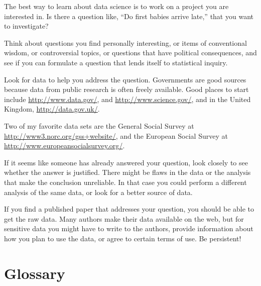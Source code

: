 \documentclass[12pt]{book}
\begin{document}
\begin{exercise}
The best way to learn about data science is to work on a project you are
interested in.  Is there a question like, ``Do first babies arrive
late,'' that you want to investigate?

Think about questions you find personally interesting, or items of
conventional wisdom, or controversial topics, or questions that have
political consequences, and see if you can formulate a question that
lends itself to statistical inquiry.

Look for data to help you address the question.  Governments are good
sources because data from public research is often freely
available.  Good places to start include \url{http://www.data.gov/},
and \url{http://www.science.gov/}, and in the United Kingdom,
\url{http://data.gov.uk/}.

Two of my favorite data sets are the General Social Survey at
\url{http://www3.norc.org/gss+website/}, and the European Social
Survey at \url{http://www.europeansocialsurvey.org/}.

If it seems like someone has already answered your question, look
closely to see whether the answer is justified.  There might be flaws
in the data or the analysis that make the conclusion unreliable.  In
that case you could perform a different analysis of the same data, or
look for a better source of data.

If you find a published paper that addresses your question, you
should be able to get the raw data.  Many authors make their data
available on the web, but for sensitive data you might have to
write to the authors, provide information about how you plan to use
the data, or agree to certain terms of use.  Be persistent!

\end{exercise}


\section{Glossary}
\end{document}
